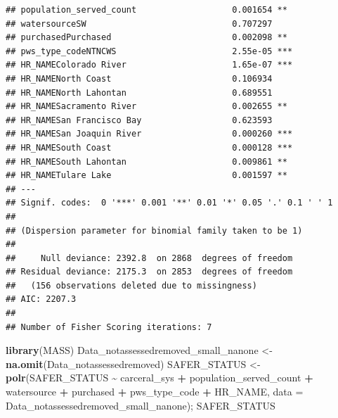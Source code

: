 \documentclass[
]{article}
\newenvironment{Shaded}{\begin{snugshade}}{\end{snugshade}}
\newcommand{\AttributeTok}[1]{\textcolor[rgb]{0.13,0.29,0.53}{#1}}
\newcommand{\FunctionTok}[1]{\textcolor[rgb]{0.13,0.29,0.53}{\textbf{#1}}}
\newcommand{\NormalTok}[1]{#1}
\newcommand{\OtherTok}[1]{\textcolor[rgb]{0.56,0.35,0.01}{#1}}
\newcommand{\SpecialCharTok}[1]{\textcolor[rgb]{0.81,0.36,0.00}{\textbf{#1}}}
\begin{document}
\begin{verbatim}
## population_served_count                   0.001654 ** 
## watersourceSW                             0.707297    
## purchasedPurchased                        0.002098 ** 
## pws_type_codeNTNCWS                       2.55e-05 ***
## HR_NAMEColorado River                     1.65e-07 ***
## HR_NAMENorth Coast                        0.106934    
## HR_NAMENorth Lahontan                     0.689551    
## HR_NAMESacramento River                   0.002655 ** 
## HR_NAMESan Francisco Bay                  0.623593    
## HR_NAMESan Joaquin River                  0.000260 ***
## HR_NAMESouth Coast                        0.000128 ***
## HR_NAMESouth Lahontan                     0.009861 ** 
## HR_NAMETulare Lake                        0.001597 ** 
## ---
## Signif. codes:  0 '***' 0.001 '**' 0.01 '*' 0.05 '.' 0.1 ' ' 1
## 
## (Dispersion parameter for binomial family taken to be 1)
## 
##     Null deviance: 2392.8  on 2868  degrees of freedom
## Residual deviance: 2175.3  on 2853  degrees of freedom
##   (156 observations deleted due to missingness)
## AIC: 2207.3
## 
## Number of Fisher Scoring iterations: 7
\end{verbatim}

\begin{Shaded}
\begin{Highlighting}[]
\FunctionTok{library}\NormalTok{(MASS)}
\NormalTok{Data\_notassessedremoved\_small\_nanone  }\OtherTok{\textless{}{-}} \FunctionTok{na.omit}\NormalTok{(Data\_notassessedremoved)}
\NormalTok{SAFER\_STATUS }\OtherTok{\textless{}{-}} \FunctionTok{polr}\NormalTok{(SAFER\_STATUS }\SpecialCharTok{\textasciitilde{}}\NormalTok{ carceral\_sys }\SpecialCharTok{+}\NormalTok{ population\_served\_count }\SpecialCharTok{+}\NormalTok{ watersource }\SpecialCharTok{+}\NormalTok{ purchased }\SpecialCharTok{+}\NormalTok{ pws\_type\_code }\SpecialCharTok{+}\NormalTok{ HR\_NAME, }\AttributeTok{data =}\NormalTok{ Data\_notassessedremoved\_small\_nanone); SAFER\_STATUS}
\end{Highlighting}
\end{Shaded}
\end{document}
